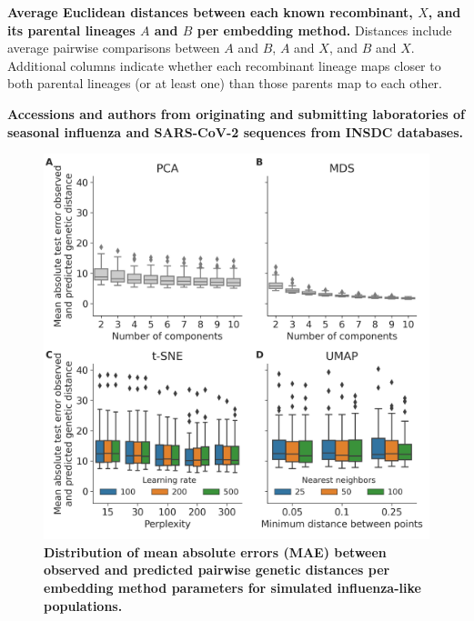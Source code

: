 \begin{table}
\caption{{\bf Average Euclidean distances between each known recombinant, $X$, and its parental lineages $A$ and $B$ per embedding method.}
Distances include average pairwise comparisons between $A$ and $B$, $A$ and $X$, and $B$ and $X$.
Additional columns indicate whether each recombinant lineage maps closer to both parental lineages (or at least one) than those parents map to each other.}\label{S_Table_recombinant_distances}
\end{table}

\begin{table}
\caption{{\bf Accessions and authors from originating and submitting laboratories of seasonal influenza and SARS-CoV-2 sequences from INSDC databases.}}\label{S_Table_accessions}
\end{table}

\begin{figure}[!h]
  \includegraphics[width=0.9\columnwidth]{figures/simulated-influenza-like-with-no-reassortment-scores-by-parameters.png}
  \caption{{\bf Distribution of mean absolute errors (MAE) between observed and predicted pairwise genetic distances per embedding method parameters for simulated influenza-like populations.}}\label{S_Fig_simulated_flu_errors}
\end{figure}

